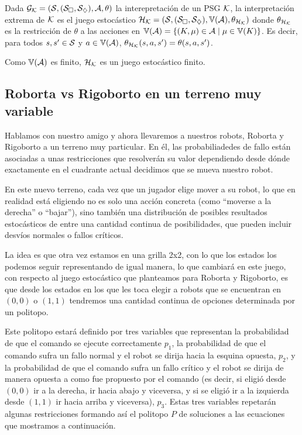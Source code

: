 \begin{definition}
	Dada $\mathcal{G}_{\mathcal{K}} = (\mathcal{S}, (\mathcal{S}_\square, \mathcal{S}_\diamondsuit), \mathcal{A}, \theta)$ la interepretación de un PSG $\mathcal{K}$, la interpretación extrema de $\mathcal{K}$ es el juego estocástico $\mathcal{H}_{\mathcal{K}} = (\mathcal{S}, (\mathcal{S}_\square, \mathcal{S}_\diamondsuit), \mathbb{V}(\mathcal{A}), \theta_{\mathcal{H}_{\mathcal{K}}})$ donde $\theta_{\mathcal{H}_{\mathcal{K}}}$ es la restricción de  $\theta$ a las acciones en $\mathbb{V}(\mathcal{A}) = \{(K, \mu) \in \mathcal{A} \mid \mu \in \mathbb{V}(K)\}$. Es decir, para todos $s, s' \in \mathcal{S}$ y $a \in \mathbb{V}(\mathcal{A})$, $\theta_{\mathcal{H}_{\mathcal{K}}}(s, a, s') = \theta(s, a, s')$.

	Como $\mathbb{V}(\mathcal{A})$ es finito, $\mathcal{H}_{\mathcal{K}}$ es un juego estocástico finito.
\end{definition}

\subsection*{Roborta vs Rigoborto en un terreno muy variable}
\label{sec:ejpsg}

Hablamos con nuestro amigo y ahora llevaremos a nuestros robots, Roborta y
Rigoborto a un terreno muy particular. En él, las probabiliadedes de fallo
están asociadas a unas restricciones que resolverán su valor dependiendo desde
dónde exactamente en el cuadrante actual decidimos que se mueva nuestro robot.

En este nuevo terreno, cada vez que un jugador elige mover a su robot, lo que
en realidad está eligiendo no es solo una acción concreta (como ``moverse a la
derecha'' o ``bajar''), sino también una distribución de posibles resultados
estocásticos de entre una cantidad continua de posibilidades, que pueden
incluir desvíos normales o fallos críticos.

La idea es que otra vez estamos en una grilla 2x2, con lo que los estados los
podemos seguir representando de igual manera, lo que cambiará en este juego,
con respecto al juego estocástico que planteamos para Roborta y Rigoborto, es
que desde los estados en los que les toca elegir a robots que se encuentran en
$(0,0)$ o $(1,1)$ tendremos una cantidad continua de opciones determinada por
un politopo.

Este politopo estará definido por tres variables que representan la
probabilidad de que el comando se ejecute correctamente $p_1$, la probabilidad
de que el comando sufra un fallo normal y el robot se dirija hacia la esquina
opuesta, $p_2$, y la probabilidad de que el comando sufra un fallo crítico y el
robot se dirija de manera opuesta a como fue propuesto por el comando (es
decir, si eligió desde $(0,0)$ ir a la derecha, ir hacia abajo y viceversa, y
si se eligió ir a la izquierda desde $(1,1)$ ir hacia arriba y viceversa),
$p_3$. Estas tres variables repetarán algunas restricciones formando así el
politopo $P$ de soluciones a las ecuaciones que mostramos a continuación.

